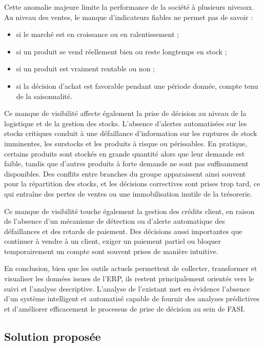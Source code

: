 \documentclass[a4paper,12pt]{report}
\begin{document}
Cette anomalie majeure limite la performance de la société à plusieurs niveaux.
Au niveau des ventes, le manque d'indicateurs fiables ne permet pas de savoir :

\begin{itemize}
    \item si le marché est en croissance ou en ralentissement ;
    \item si un produit se vend réellement bien ou reste longtemps en stock ;
    \item si un produit est vraiment rentable ou non ;
    \item si la décision d'achat est favorable pendant une période donnée, compte tenu de la saisonnalité.
\end{itemize}

Ce manque de visibilité affecte également la prise de décision au niveau de la
logistique et de la gestion des stocks. L'absence d'alertes automatisées sur les
stocks critiques conduit à une défaillance d'information sur les ruptures de stock
imminentes, les surstocks et les produits à risque ou périssables. En pratique,
certains produits sont stockés en grande quantité alors que leur demande est
faible, tandis que d'autres produits à forte demande ne sont pas suffisamment
disponibles. Des conflits entre branches du groupe apparaissent ainsi souvent pour
la répartition des stocks, et les décisions correctives sont prises trop tard, ce
qui entraîne des pertes de ventes ou une immobilisation inutile de la trésorerie.

Ce manque de visibilité touche également la gestion des crédits client, en raison
de l'absence d'un mécanisme de détection ou d'alerte automatique des défaillances
et des retards de paiement. Des décisions aussi importantes que continuer à vendre
à un client, exiger un paiement partiel ou bloquer temporairement un compte sont
souvent prises de manière intuitive.

En conclusion, bien que les outils actuels permettent de collecter, transformer et
visualiser les données issues de l'ERP, ils restent principalement orientés vers
le suivi et l'analyse descriptive. L'analyse de l'existant met en évidence
l'absence d'un système intelligent et automatisé capable de fournir des analyses
prédictives et d'améliorer efficacement le processus de prise de décision au sein
de FASI.
\subsection{Solution proposée}
\end{document}
